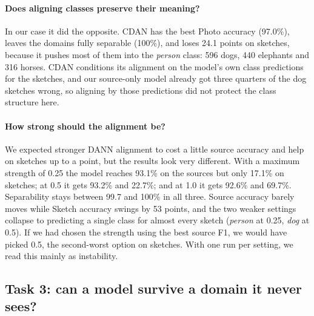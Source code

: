 \documentclass{article}
\begin{document}
\paragraph{Does aligning classes preserve their meaning?} In our case it did the opposite. CDAN has the best Photo accuracy (97.0\%), leaves the domains fully separable (100\%), and loses 24.1 points on sketches, because it pushes most of them into the \emph{person} class: 596 dogs, 440 elephants and 316 horses. CDAN conditions its alignment on the model's own class predictions for the sketches, and our source-only model already got three quarters of the dog sketches wrong, so aligning by those predictions did not protect the class structure here.

\paragraph{How strong should the alignment be?} We expected stronger DANN alignment to cost a little source accuracy and help on sketches up to a point, but the results look very different. With a maximum strength of 0.25 the model reaches 93.1\% on the sources but only 17.1\% on sketches; at 0.5 it gets 93.2\% and 22.7\%; and at 1.0 it gets 92.6\% and 69.7\%. Separability stays between 99.7 and 100\% in all three. Source accuracy barely moves while Sketch accuracy swings by 53 points, and the two weaker settings collapse to predicting a single class for almost every sketch (\emph{person} at 0.25, \emph{dog} at 0.5). If we had chosen the strength using the best source F1, we would have picked 0.5, the second-worst option on sketches. With one run per setting, we read this mainly as instability.

\subsection{Task 3: can a model survive a domain it never sees?}
\end{document}
